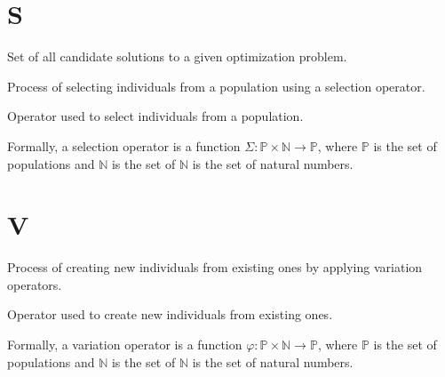   \section*{S}
    \begin{definition}
    \label{def:search_space}
      Set of all candidate solutions to a given optimization problem.
    \end{definition}
    
    \begin{definition}[Selection]
    \label{def:selection}
      Process of selecting individuals from a population using a selection operator.
    \end{definition}

    \begin{definition}
    \label{def:selection_operator}
      Operator used to select individuals from a population.

      Formally, a selection operator is a function \(\Sigma : \mathbb{P} \times \mathbb{N} \to
      \mathbb{P}\), where \(\mathbb{P}\) is the set of populations and \(\mathbb{N}\) is the set of
      \(\mathbb{N}\) is the set of natural numbers.
    \end{definition}

  \section*{V}
    \begin{definition}[Variation]
    \label{def:variation}
      Process of creating new individuals from existing ones by applying variation operators.
    \end{definition}

    \begin{definition}
    \label{def:variation_operator}
      Operator used to create new individuals from existing ones.

      Formally, a variation operator is a function \(\varphi : \mathbb{P} \times \mathbb{N} \to
      \mathbb{P}\), where \(\mathbb{P}\) is the set of populations and \(\mathbb{N}\) is the set of
      \(\mathbb{N}\) is the set of natural numbers.
    \end{definition}
